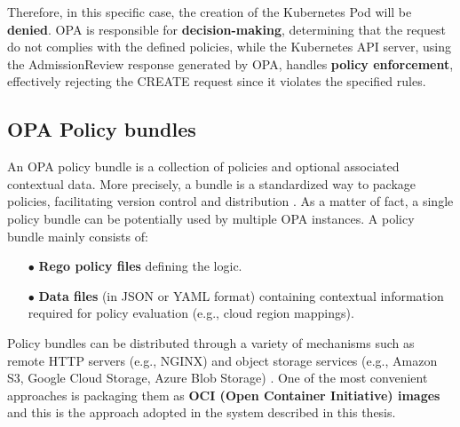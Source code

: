 Therefore, in this specific case, the creation of the Kubernetes Pod will be \textbf{denied}. OPA is responsible for \textbf{decision-making}, determining that the request do not complies with the defined policies, while the Kubernetes API server, using the AdmissionReview response generated by OPA, handles \textbf{policy enforcement}, effectively rejecting the CREATE request since it violates the specified rules.

\subsection{OPA Policy bundles}
\label{sec:opa_bundles}

An OPA policy bundle is a collection of policies and optional associated contextual data. More precisely, a bundle is a standardized way to package policies, facilitating version control and distribution \cite{opa_bundles}. As a matter of fact, a single policy bundle can be potentially used by multiple OPA instances.
A policy bundle mainly consists of:
\begin{itemize}[itemsep=0.2pt, topsep=1pt]
  \item[$\bullet$] \textbf{Rego policy files} defining the logic.
  \item[$\bullet$] \textbf{Data files} (in JSON or YAML format) containing contextual information required for policy evaluation (e.g., cloud region mappings).
\end{itemize} 

Policy bundles can be distributed through a variety of mechanisms such as remote HTTP servers (e.g., NGINX) and object storage services (e.g., Amazon S3, Google Cloud Storage, Azure Blob Storage) \cite{opa_bundles}.
One of the most convenient approaches is packaging them as \textbf{OCI (Open Container Initiative) images} \cite{oci} and this is the approach adopted in the system described in this thesis.

